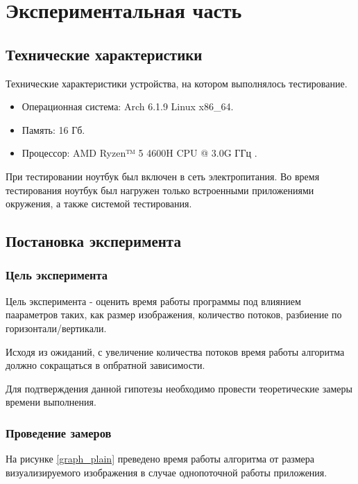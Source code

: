 \section{Экспериментальная часть}

\subsection{Технические характеристики}

Технические характеристики устройства, на котором выполнялось тестирование.

\begin{itemize}
    \item Операционная система: Arch 6.1.9 \cite{Arch} Linux \cite{Linux} x86\_64.
    \item Память: 16 Гб.
    \item Процессор: AMD Ryzen™ 5 4600H CPU @ 3.0G ГГц \cite{AMD_CPU}.
\end{itemize}

При тестировании ноутбук был включен в сеть электропитания. Во время
тестирования ноутбук был нагружен только встроенными приложениями окружения,
а также системой тестирования.

\subsection{Постановка эксперимента}

\subsubsection{Цель эксперимента}

Цель эксперимента - оценить время работы программы под влиянием паараметров
таких, как размер изображения, количество потоков, разбиение по
горизонтали/вертикали.

Исходя из ожиданий, с увеличение количества потоков время работы алгоритма
должно сокращаться в опбратной зависимости.

Для подтверждения данной гипотезы необходимо провести теоретические замеры
времени выполнения.

\subsubsection{Проведение замеров}

На рисунке \ref{graph_plain} преведено время работы алгоритма от размера
визуализируемого изображения в случае однопоточной работы приложения.

